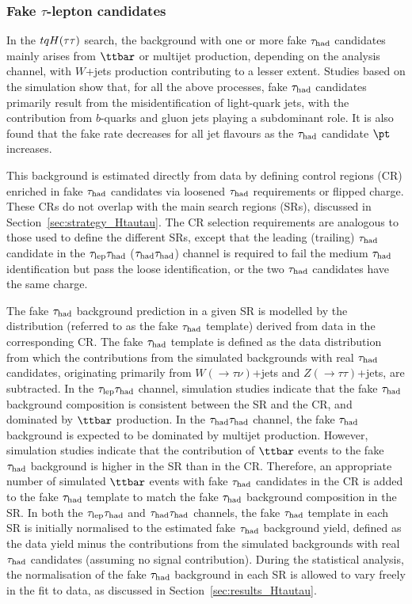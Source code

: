 \subsubsection{Fake $\tau$-lepton candidates}
\label{sec:faketaus}
In the $tqH(\tau\tau)$ search, the background with one or more fake $\tau_{\mathrm{had}}$ candidates mainly arises from $\ttbar$ or
multijet production, depending on the analysis channel, with $W$+jets production contributing to a lesser extent. 
Studies based on the simulation show that, for all the above processes, fake $\tau_{\mathrm{had}}$ candidates primarily result from the 
misidentification of light-quark jets, with the contribution from $b$-quarks and gluon jets playing a subdominant role.
It is also found that the fake rate decreases for all jet flavours as the $\tau_{\mathrm{had}}$ candidate $\pt$ increases.

This background is estimated directly from data by defining control regions (CR) enriched in fake $\tau_{\mathrm{had}}$ candidates via loosened $\tau_{\mathrm{had}}$ requirements or flipped charge. These CRs do not overlap with the main search regions (SRs), discussed in Section~\ref{sec:strategy_Htautau}. The CR selection requirements are analogous to those used to define the different SRs, except that the leading (trailing) $\tau_{\mathrm{had}}$ candidate 
in the $\tau_{\mathrm{lep}} \tau_{\mathrm{had}}$ ($\tau_{\mathrm{had}} \tau_{\mathrm{had}}$) channel is required to fail the medium $\tau_{\mathrm{had}}$ identification but pass the loose identification, or the two $\tau_{\mathrm{had}}$ candidates have the same charge.

The fake $\tau_{\mathrm{had}}$ background prediction in a given SR is modelled by the distribution (referred to as the fake $\tau_{\mathrm{had}}$ template) derived from data in the corresponding CR. The fake $\tau_{\mathrm{had}}$ template is defined as the data distribution from which the contributions from the simulated backgrounds with real $\tau_{\mathrm{had}}$ candidates, originating primarily from 
$W(\to \tau\nu)$+jets and $Z(\to \tau\tau)$+jets, are subtracted. In the $\tau_{\mathrm{lep}} \tau_{\mathrm{had}}$ channel, simulation studies indicate that the fake $\tau_{\mathrm{had}}$ background composition is consistent between the SR and the CR, and dominated by $\ttbar$ production. In the $\tau_{\mathrm{had}} \tau_{\mathrm{had}}$ channel, the fake $\tau_{\mathrm{had}}$ background is expected to be dominated by multijet production. However, simulation studies indicate that the contribution of $\ttbar$ events to the fake $\tau_{\mathrm{had}}$ background is higher in the SR than in the CR. Therefore, an appropriate number of simulated $\ttbar$ events with fake $\tau_{\mathrm{had}}$ candidates in the CR is added to the fake $\tau_{\mathrm{had}}$ template to match the fake $\tau_{\mathrm{had}}$ background composition in the SR. 
In both the $\tau_{\mathrm{lep}} \tau_{\mathrm{had}}$ and $\tau_{\mathrm{had}} \tau_{\mathrm{had}}$ channels, the fake $\tau_{\mathrm{had}}$ template in each SR is initially normalised to the estimated fake $\tau_{\mathrm{had}}$ background yield, 
defined as the data yield minus the contributions from the simulated backgrounds with real $\tau_{\mathrm{had}}$ candidates (assuming no signal contribution).
During the statistical analysis, the normalisation of the fake $\tau_{\mathrm{had}}$ background in each SR is allowed to vary freely in the fit to data, as discussed in Section~\ref{sec:results_Htautau}.

